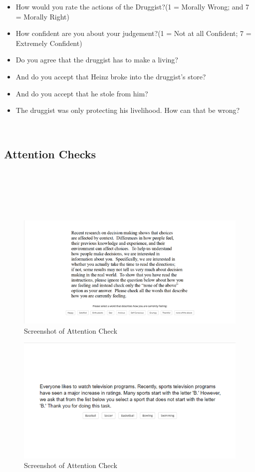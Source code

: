 \documentclass[
  american,
  man,floatsintext]{apa7}
\providecommand{\tightlist}{%
  \setlength{\itemsep}{0pt}\setlength{\parskip}{0pt}}
\begin{document}
\begin{itemize}
\tightlist
\item
  How would you rate the actions of the Druggist?(1 = Morally Wrong; and 7 = Morally Right)
\item
  How confident are you about your judgement?(1 = Not at all Confident; 7 = Extremely Confident)
\item
  Do you agree that the druggist has to make a living?
\item
  And do you accept that Heinz broke into the druggist's store?
\item
  And do you accept that he stole from him?
\item
  The druggist was only protecting his livelihood. How can that be wrong?
\end{itemize}

~

\newpage

\hypertarget{attention-checks}{%
\subsection{Attention Checks}\label{attention-checks}}

~

~

~

\begin{figure}
\centering
\includegraphics[width=6.25in,height=\textheight]{../resources/images/attention1a.png}
\caption{Screenshot of Attention Check}
\end{figure}

\begin{figure}
\centering
\includegraphics[width=5.20833in,height=\textheight]{../resources/images/attention2a.png}
\caption{Screenshot of Attention Check}
\end{figure}
\end{document}
